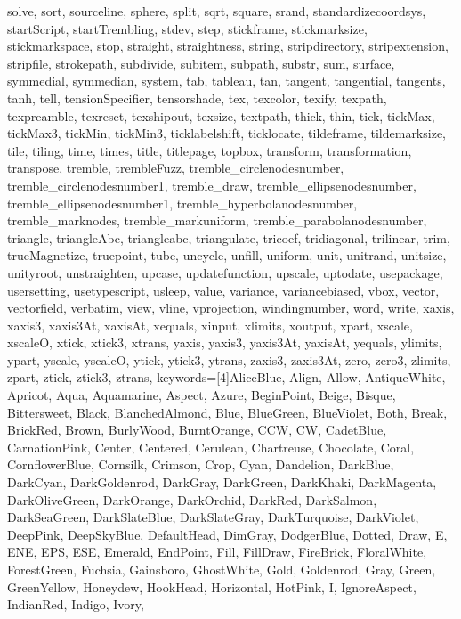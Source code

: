 {{  solve, sort, sourceline, sphere, split, sqrt, square, srand,
  standardizecoordsys, startScript, startTrembling, stdev, step, stickframe,
  stickmarksize, stickmarkspace, stop, straight, straightness, string,
  stripdirectory, stripextension, stripfile, strokepath, subdivide, subitem,
  subpath, substr, sum, surface, symmedial, symmedian, system, tab, tableau,
  tan, tangent, tangential, tangents, tanh, tell, tensionSpecifier,
  tensorshade, tex, texcolor, texify, texpath, texpreamble, texreset,
  texshipout, texsize, textpath, thick, thin, tick, tickMax, tickMax3,
  tickMin, tickMin3, ticklabelshift, ticklocate, tildeframe, tildemarksize,
  tile, tiling, time, times, title, titlepage, topbox, transform,
  transformation, transpose, tremble, trembleFuzz, tremble_circlenodesnumber,
  tremble_circlenodesnumber1, tremble_draw, tremble_ellipsenodesnumber,
  tremble_ellipsenodesnumber1, tremble_hyperbolanodesnumber,
  tremble_marknodes, tremble_markuniform, tremble_parabolanodesnumber,
  triangle, triangleAbc, triangleabc, triangulate, tricoef, tridiagonal,
  trilinear, trim, trueMagnetize, truepoint, tube, uncycle, unfill, uniform,
  unit, unitrand, unitsize, unityroot, unstraighten, upcase, updatefunction,
  upscale, uptodate, usepackage, usersetting, usetypescript, usleep, value,
  variance, variancebiased, vbox, vector, vectorfield, verbatim, view, vline,
  vprojection, windingnumber, word, write, xaxis, xaxis3, xaxis3At, xaxisAt,
  xequals, xinput, xlimits, xoutput, xpart, xscale, xscaleO, xtick, xtick3,
  xtrans, yaxis, yaxis3, yaxis3At, yaxisAt, yequals, ylimits, ypart, yscale,
  yscaleO, ytick, ytick3, ytrans, zaxis3, zaxis3At, zero, zero3, zlimits,
  zpart, ztick, ztick3, ztrans},
  keywords=[4]{AliceBlue, Align, Allow, AntiqueWhite, Apricot, Aqua,
  Aquamarine, Aspect, Azure, BeginPoint, Beige, Bisque, Bittersweet, Black,
  BlanchedAlmond, Blue, BlueGreen, BlueViolet, Both, Break, BrickRed, Brown,
  BurlyWood, BurntOrange, CCW, CW, CadetBlue, CarnationPink, Center,
  Centered, Cerulean, Chartreuse, Chocolate, Coral, CornflowerBlue, Cornsilk,
  Crimson, Crop, Cyan, Dandelion, DarkBlue, DarkCyan, DarkGoldenrod,
  DarkGray, DarkGreen, DarkKhaki, DarkMagenta, DarkOliveGreen, DarkOrange,
  DarkOrchid, DarkRed, DarkSalmon, DarkSeaGreen, DarkSlateBlue,
  DarkSlateGray, DarkTurquoise, DarkViolet, DeepPink, DeepSkyBlue,
  DefaultHead, DimGray, DodgerBlue, Dotted, Draw, E, ENE, EPS, ESE, Emerald,
  EndPoint, Fill, FillDraw, FireBrick, FloralWhite, ForestGreen, Fuchsia,
  Gainsboro, GhostWhite, Gold, Goldenrod, Gray, Green, GreenYellow, Honeydew,
  HookHead, Horizontal, HotPink, I, IgnoreAspect, IndianRed, Indigo, Ivory,
}}
